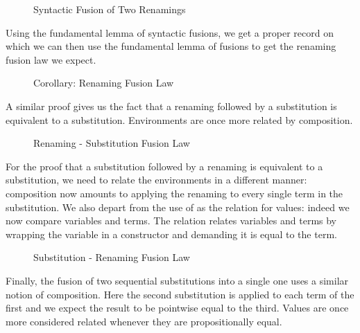 \begin{figure}[h]
\caption{Syntactic Fusion of Two Renamings\label{fig:renrenfus}}
\end{figure}

Using the fundamental lemma of syntactic fusions, we get a proper  record
on which we can then use the fundamental lemma of fusions to get the renaming fusion
law we expect.

\begin{figure}[h]
\caption{Corollary: Renaming Fusion Law\label{fig:renren}}
\end{figure}

A similar proof gives us the fact that a renaming followed by a substitution is equivalent
to a substitution. Environments are once more related by composition.

\begin{figure}[h]
\caption{Renaming - Substitution Fusion Law\label{fig:rensub}}
\end{figure}

For the proof that a substitution followed by a renaming is equivalent to a substitution, we
need to relate the environments in a different manner: composition now amounts to applying
the renaming to every single term in the substitution. We also depart from the use of 
as the relation for values: indeed we now compare variables and terms. The relation 
relates variables and terms by wrapping the variable in a  constructor and demanding
it is equal to the term.

\begin{figure}[h]
\caption{Substitution - Renaming Fusion Law\label{fig:subren}}
\end{figure}

Finally, the fusion of two sequential substitutions into a single one uses a
similar notion of composition. Here the second substitution is applied to each
term of the first and we expect the result to be pointwise equal to the third.
Values are once more considered related whenever they are propositionally equal.

